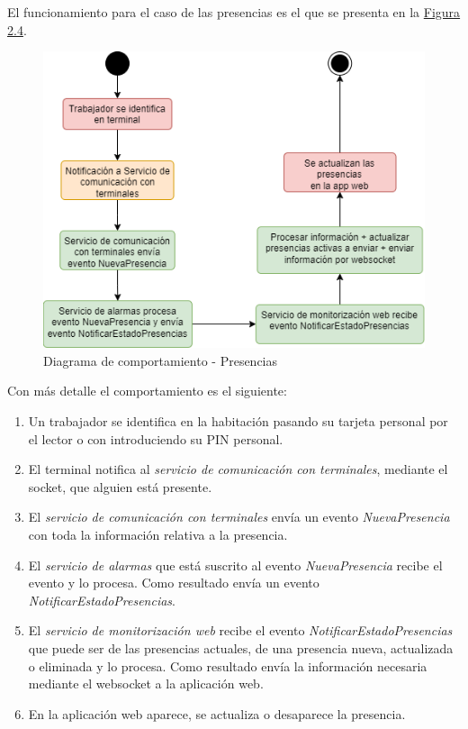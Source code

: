 \newpage
El funcionamiento para el caso de las presencias es el que se presenta en la \hyperref[fig:flujograma-alarmas]{Figura 2.4}.

\begin{figure}[H]
    \centering
    \includegraphics[width=12cm]{Imagenes/Flujograma-presencias.png}
    \caption{Diagrama de comportamiento - Presencias}
    \label{fig:flujograma-presencias}
\end{figure}

Con más detalle el comportamiento es el siguiente:
\begin{enumerate}
	\item Un trabajador se identifica en la habitación pasando su tarjeta personal por el lector o con introduciendo su PIN personal.
	\item El terminal notifica al \textit{servicio de comunicación con terminales}, mediante el socket, que alguien está presente.
	\item El \textit{servicio de comunicación con terminales} envía un evento \textit{NuevaPresencia} con toda la información relativa a la presencia.
	\item El \textit{servicio de alarmas} que está suscrito al evento \textit{NuevaPresencia} recibe el evento y lo procesa. Como resultado envía un evento \textit{NotificarEstadoPresencias}.
	\item El \textit{servicio de monitorización web} recibe el evento \textit{NotificarEstadoPresencias} que puede ser de las presencias actuales, de una presencia nueva, actualizada o eliminada y lo procesa. Como resultado envía la información necesaria mediante el websocket a la aplicación web.
	\item En la aplicación web aparece, se actualiza o desaparece la presencia.
\end{enumerate}

